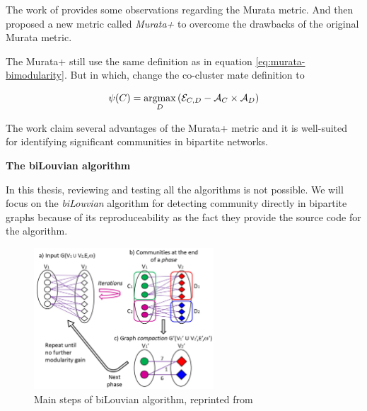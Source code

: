 The work of \cite{pesantez2018} provides some observations regarding the Murata metric.
And then proposed a new metric called \textit{Murata+} to overcome the drawbacks of the original Murata metric.

The Murata+ still use the same definition as in equation \ref{eq:murata-bimodularity}.
But in which, change the co-cluster mate definition to

\begin{equation}
	\psi(C) = \operatorname*{argmax}_D \left(\mathcal{E}_{C, D} - \mathcal{A}_C \times \mathcal{A}_D\right)
\end{equation}

The work claim several advantages of the Murata+ metric and it is well-suited for identifying significant communities in bipartite networks.

\textbf{The biLouvian algorithm}

In this thesis, reviewing and testing all the algorithms is not possible.
We will focus on the \textit{biLouvian} algorithm \cite{pesantez2018} for detecting community directly in bipartite graphs
because of its reproduceability as the fact they provide the source code for the algorithm.

\begin{figure}[H]
	\centering
	\includegraphics[width=0.6\textwidth]{images/biLouvian-algorithm.png}
	\caption{Main steps of biLouvian algorithm, reprinted from \cite{pesantez2018}}
	\label{fig:biLouvian-algorithm}
\end{figure}


